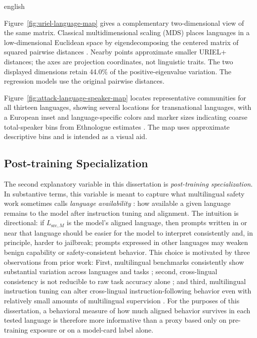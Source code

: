 \begin{otherlanguage*}{english}
\UrielDistanceMatrixTable

Figure~\ref{fig:uriel-language-map} gives a complementary two-dimensional view of the same matrix. Classical multidimensional scaling (MDS) places languages in a low-dimensional Euclidean space by eigendecomposing the centered matrix of squared pairwise distances \cite{gower1966distance}. Nearby points approximate smaller URIEL+ distances; the axes are projection coordinates, not linguistic traits. The two displayed dimensions retain 44.0\% of the positive-eigenvalue variation. The regression models use the original pairwise distances.

\UrielLanguageMapFigure

Figure~\ref{fig:attack-language-speaker-map} locates representative communities for all thirteen languages, showing several locations for transnational languages, with a European inset and language-specific colors and marker sizes indicating coarse total-speaker bins from Ethnologue estimates \cite{eberhard2025ethnologue}. The map uses approximate descriptive bins and is intended as a visual aid.

\AttackLanguageSpeakerMapFigure

\FloatBarrier


\subsection{Post-training Specialization}
\label{sec:post-training-specialization}

The second explanatory variable in this dissertation is \emph{post-training specialization}. In substantive terms, this variable is meant to capture what multilingual safety work sometimes calls \emph{language availability} \cite{dengMultilingualJailbreakChallenges2024}: how available a given language remains to the model after instruction tuning and alignment. The intuition is directional: if $L_{\mathrm{src},M}$ is the model's aligned language, then prompts written in or near that language should be easier for the model to interpret consistently and, in principle, harder to jailbreak; prompts expressed in other languages may weaken benign capability or safety-consistent behavior.
This choice is motivated by three observations from prior work: First, multilingual benchmarks consistently show substantial variation across languages and tasks \cite{hu2020xtreme,chollampatt2025cross}; second, cross-lingual consistency is not reducible to raw task accuracy alone \cite{qi2023crosslingual,xing2024inconsistency}; and third, multilingual instruction tuning can alter cross-lingual instruction-following behavior even with relatively small amounts of multilingual supervision \cite{shaham2024multilingual}. For the purposes of this dissertation, a behavioral measure of how much aligned behavior survives in each tested language is therefore more informative than a proxy based only on pre-training exposure or on a model-card label alone.


\end{otherlanguage*}
